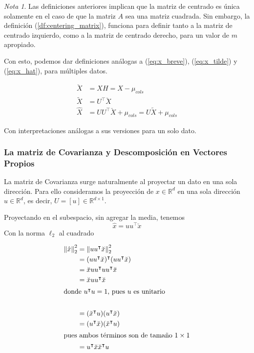 \documentclass{article}
\numberwithin{equation}{section}
\theoremstyle{remark}
\theoremstyle{definition}
\theoremstyle{remark}
\theoremstyle{remark}
\newtheorem{note}{Nota}
\begin{document}
\begin{note}
    Las definiciones anteriores implican que la matriz de centrado es única solamente en el caso de que la matriz $A$ sea una matriz cuadrada. 
    Sin embargo, la definición (\ref{df:centering_matrix}), funciona para definir tanto a la matriz de centrado izquierdo, como a la matriz de centrado
    derecho, para un valor de $m$ apropiado.   
\end{note}


Con esto, podemos dar definiciones análogas a (\ref{eq:x_breve}), (\ref{eq:x_tilde}) y (\ref{eq:x_hat}), para múltiples datos.

\begin{align}
    \label{eq:X_breve}
    \breve{X} &= XH  = X - \mu_{cols} \\
    \label{eq:X_tilde}
    \tilde{X} &= U^\intercal \breve{X} \\
    \label{eq:X_hat}
    \hat{X}   &= U U^\intercal \breve{X} + \mu_{cols} = U \tilde{X} + \mu_{cols}
\end{align}

Con interpretaciones análogas a sus versiones para un solo dato.
\subsubsection{La matriz de Covarianza y Descomposición en Vectores Propios}

La matriz de Covarianza surge naturalmente al proyectar un dato en una sola dirección.
Para ello consideramos la proyección de $x \in \mathbb{R}^d$ en una sola dirección $u \in \mathbb{R}^d$,
es decir, $U = [u] \in \mathbb{R}^{d \times 1}$. 

Proyectando en el subespacio, sin agregar la media, tenemos
$$\hat{x} = u u^\intercal \breve{x}$$
Con la norma $\ell_2$ al cuadrado

\begin{align*}
    \left\| \hat{x}\right\|^2_2 &= \left\|u u^\intercal \breve{x}\right\|^2_2 \\
            &= (u u^\intercal \breve{x})^\intercal (u u^\intercal \breve{x}) \\
            &= \breve{x} u u^\intercal u u^\intercal \breve{x} \\
            &= \breve{x} u u^\intercal \breve{x} \\
        \intertext{donde $u^\intercal u = 1$, pues $u$ es unitario} \\
            &= (\breve{x}^\intercal u)(u^\intercal \breve{x})\\
            &= (u^\intercal \breve{x})(\breve{x}^\intercal u)\\
        \intertext{pues ambos términos son de tamaño $1 \times 1$}
            &= u^\intercal \breve{x}\breve{x}^\intercal u\\
\end{align*}
\end{document}
